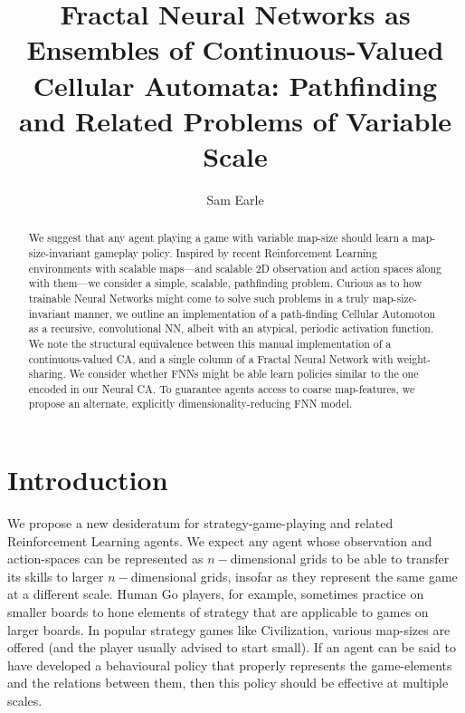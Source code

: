\documentclass{article}
\title{Fractal Neural Networks as Ensembles of Continuous-Valued Cellular Automata: Pathfinding and Related Problems of Variable Scale}
\author{%
  Sam Earle
}
\begin{document}
\newpage
\maketitle

\begin{abstract}
We suggest that any agent playing a game with variable map-size should learn a map-size-invariant gameplay policy. 
Inspired by recent Reinforcement Learning environments with scalable maps---and scalable 2D observation and action spaces along with them---we consider a simple, scalable, pathfinding problem. 
Curious as to how trainable Neural Networks might come to solve such problems in a truly map-size-invariant manner, we outline an implementation of a path-finding Cellular Automoton as a recursive, convolutional NN, albeit with an atypical, periodic activation function.
We note the structural equivalence between this manual implementation of a continuous-valued CA, and a single column of a Fractal Neural Network with weight-sharing.
We consider whether FNNs might be able learn policies similar to the one encoded in our Neural CA.  
To guarantee agents access to coarse map-features, we propose an alternate, explicitly dimensionality-reducing FNN model.
\end{abstract}

\section{Introduction}

We propose a new desideratum for strategy-game-playing and related Reinforcement Learning agents.
We expect any agent whose observation and action-spaces can be represented as $n-$dimensional grids to be able to transfer its skills to larger $n-$dimensional grids, insofar as they represent the same game at a different scale.
Human Go players, for example, sometimes practice on smaller boards to hone elements of strategy that are applicable to games on larger boards.
In popular strategy games like Civilization, various map-sizes are offered (and the player usually advised to start small).
If an agent can be said to have developed a behavioural policy that properly represents the game-elements and the relations between them, then this policy should be effective at multiple scales.
\end{document}
